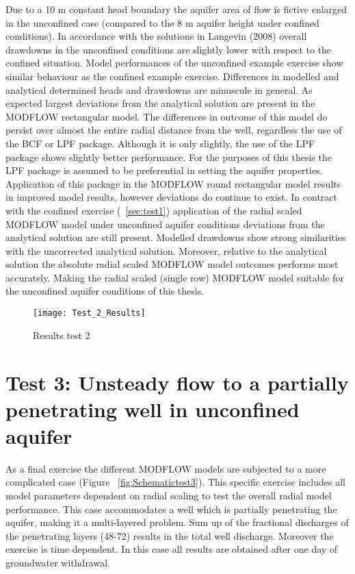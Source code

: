 Due to a 10 m constant head boundary the aquifer area of flow is fictive enlarged in the unconfined case (compared to the 8 m aquifer height under confined conditions). In accordance with the solutions in Langevin (2008) overall drawdowns in the unconfined conditions are slightly lower with respect to the confined situation. 
\bigskip
Model performances of the unconfined example exercise show similar behaviour as the confined example exercise. Differences in modelled and analytical determined heads and drawdowns are minuscule in general. As expected largest deviations from the analytical solution are present in the MODFLOW rectangular model. The differences in outcome of this model do persist over almost the entire radial distance from the well, regardless the use of the BCF or LPF package. Although it is only slightly, the use of the LPF package shows slightly better performance. For the purposes of this thesis the LPF package is assumed to be preferential in setting the aquifer properties. Application of this package in the MODFLOW round rectangular model results in improved model results, however deviations do continue to exist. In contract with the confined exercise (~\ref{sec:test1}) application of the radial scaled MODFLOW model under unconfined aquifer conditions  deviations from the analytical solution are still present. Modelled drawdowns show strong similarities with the uncorrected analytical solution. Moreover, relative to the analytical solution the absolute radial scaled MODFLOW model outcomes performs most accurately. Making the radial scaled (single row) MODFLOW model suitable for the unconfined aquifer conditions of this thesis.   

\begin{figure}[H]
 \centering\texttt{[image: Test\_2\_Results]}
 \captionsetup{justification=centering}
 \caption{Results test 2}
 \label{fig:Test2_results}
\end{figure} 

\clearpage\section{Test 3: Unsteady flow to a partially penetrating well in unconfined aquifer}

As a final exercise the different MODFLOW models are subjected to a more complicated case (Figure ~\ref{fig:Schematictest3}). This specific exercise includes all model parameters dependent on radial scaling to test the overall radial model performance. This case accommodates a well which is partially penetrating the aquifer, making it a multi-layered problem. Sum up of the fractional discharges of the penetrating layers (48-72) results in the total well discharge. Moreover the exercise is time dependent. In this case all results are obtained after one day of groundwater withdrawal. 

